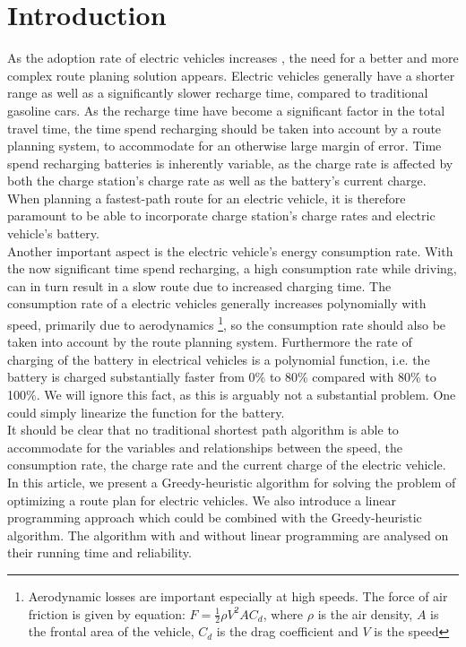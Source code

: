 \section{Introduction}

As the adoption rate of electric vehicles increases \cite{ev-sales-increasing}, the need for a better and more complex route planing solution appears. Electric vehicles generally have a shorter range as well as a significantly slower recharge time, compared to traditional gasoline cars. As the recharge time have become a significant factor in the total travel time, the time spend recharging should be taken into account by a route planning system, to accommodate for an otherwise large margin of error. Time spend recharging batteries is inherently variable, as the charge rate is affected by both the charge station's charge rate as well as the battery's current charge. When planning a fastest-path route for an electric vehicle, it is therefore paramount to be able to incorporate charge station's charge rates and electric vehicle's battery.\\

Another important aspect is the electric vehicle's energy consumption rate. With the now significant time spend recharging, a high consumption rate while driving, can in turn result in a slow route due to increased charging time. The consumption rate of a electric vehicles generally increases polynomially with speed, primarily due to aerodynamics \footnote{Aerodynamic losses are important especially at high speeds. The force of air friction is given by equation: $F = \frac{1}{2} \rho V^2 A C_d$, where $\rho$ is the air density, $A$ is the frontal area of the vehicle, $C_d$ is the drag coefficient and $V$ is the speed}, so the consumption rate should also be taken into account by the route planning system. Furthermore the rate of charging of the battery in electrical vehicles is a polynomial function, i.e. the battery is charged substantially faster from 0\% to 80\% compared with 80\% to 100\%. We will ignore this fact, as this is arguably not a substantial problem. One could simply linearize the function for the battery.\\

It should be clear that no traditional shortest path algorithm is able to accommodate for the variables and relationships between the speed, the consumption rate, the charge rate and the current charge of the electric vehicle. In this article, we present a Greedy-heuristic algorithm for solving the problem of optimizing a route plan for electric vehicles. We also introduce a linear programming approach which could be combined with the Greedy-heuristic algorithm. The algorithm with and without linear programming are analysed on their running time and reliability.




